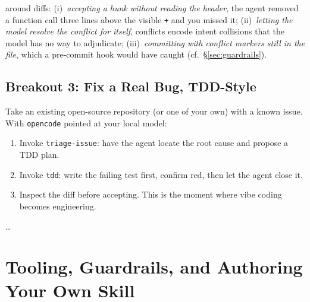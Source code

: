 \documentclass{../sharedAssets/tufte}
\begin{document}
 around diffs:
(i)~\emph{accepting a hunk without reading the header}, the agent removed
a function call three lines above the visible \texttt{+} and you missed
it; (ii)~\emph{letting the model resolve the conflict for itself},
conflicts encode intent collisions that the model has no way to
adjudicate; (iii)~\emph{committing with conflict markers still in the
file}, which a pre-commit hook would have caught (cf.\ \S\ref{sec:guardrails}).


\section{Breakout 3: Fix a Real Bug, TDD-Style}
\label{sec:breakout-3}

 Take an existing open-source repository
(or one of your own) with a known issue. With \texttt{opencode}
pointed at your local model:

\begin{enumerate}
  \item Invoke \texttt{triage-issue}: have the agent locate the
        root cause and propose a TDD plan.
  \item Invoke \texttt{tdd}: write the failing test first,
        confirm red, then let the agent close it.
  \item Inspect the diff before accepting. This is the moment
        where vibe coding becomes engineering.
\end{enumerate}


\vspace{1em}
\dots

\chapter{Tooling, Guardrails, and Authoring Your Own Skill}
\label{ch:tooling}
\end{document}
